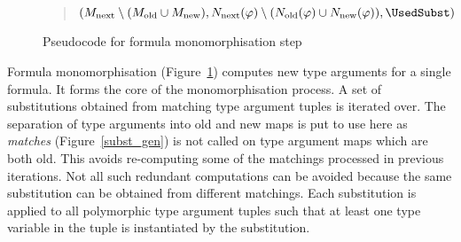 \documentclass[]{ceurart}
\begin{document}
\begin{figure}
\begin{quote}
\begin{algorithm}[H]
{   

   \BlankLine

   \Return \((M_{\text{next}}\setminus (M_{\text{old}} \cup M_{\text{new}}), N_{\text{next}}(\varphi)\setminus (N_{\text{old}}(\varphi)\cup N_{\text{new}}(\varphi)), \UsedSubst)\)
}

\end{algorithm}
\end{quote}
\caption{Pseudocode for formula monomorphisation step}
\label{mono_step}
\end{figure}


Formula monomorphisation (Figure~\ref{mono_step}) computes new type arguments for a single formula. It forms the core of the monomorphisation process. A set of substitutions obtained from matching type argument tuples is iterated over. The separation of type arguments into old and new maps is put to use here as \emph{matches} (Figure~\ref{subst_gen}) is not called on type argument maps which are both old. This avoids re-computing some of the matchings processed in previous iterations. Not all such redundant computations can be avoided because the same substitution can be obtained from different matchings. Each substitution is applied to all polymorphic type argument tuples such that at least one type variable in the tuple is instantiated by the substitution.
\end{document}
